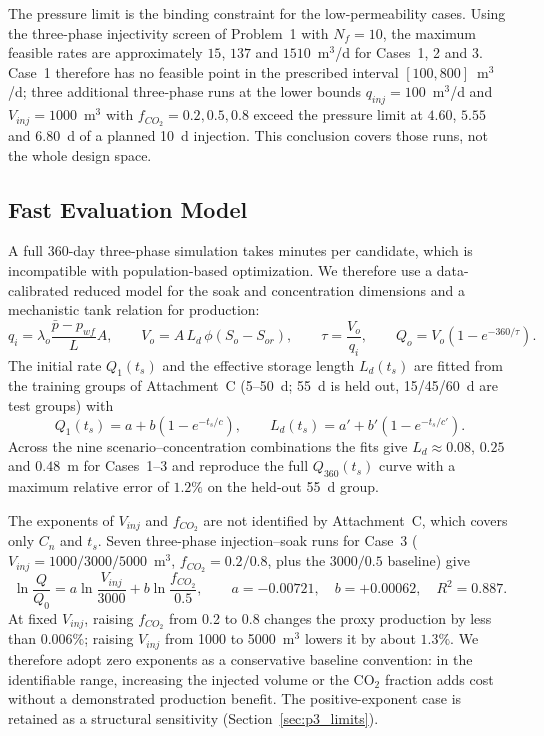 The pressure limit is the binding constraint for the low-permeability cases.
Using the three-phase injectivity screen of Problem~1 with $N_f=10$, the
maximum feasible rates are approximately $15$, $137$ and $1510$~m$^3$/d for
Cases~1, 2 and 3. Case~1 therefore has no feasible point in the prescribed
interval $[100,800]$~m$^3$/d; three additional three-phase runs at the lower
bounds $q_{inj}=100$~m$^3$/d and $V_{inj}=1000$~m$^3$ with
$f_{CO_2}=0.2,0.5,0.8$ exceed the pressure limit at $4.60$, $5.55$ and
$6.80$~d of a planned 10~d injection. This conclusion covers those runs, not
the whole design space.

\subsection{Fast Evaluation Model}

A full 360-day three-phase simulation takes minutes per candidate, which is
incompatible with population-based optimization. We therefore use a
data-calibrated reduced model for the soak and concentration dimensions and a
mechanistic tank relation for production:
\begin{equation}
q_i=\lambda_o\frac{\bar p-p_{wf}}{L}A,\qquad
V_o=A\,L_d\,\phi\left(S_o-S_{or}\right),\qquad
\tau=\frac{V_o}{q_i},\qquad
Q_o=V_o\left(1-e^{-360/\tau}\right).
\label{eq:tank}
\end{equation}
The initial rate $Q_1(t_s)$ and the effective storage length $L_d(t_s)$ are
fitted from the training groups of Attachment~C (5--50~d; 55~d is held out,
15/45/60~d are test groups) with
\begin{equation}
Q_1(t_s)=a+b\left(1-e^{-t_s/c}\right),\qquad
L_d(t_s)=a'+b'\left(1-e^{-t_s/c'}\right).
\label{eq:fit}
\end{equation}
Across the nine scenario--concentration combinations the fits give
$L_d\approx0.08$, $0.25$ and $0.48$~m for Cases~1--3 and reproduce the full
$Q_{360}(t_s)$ curve with a maximum relative error of $1.2\%$ on the held-out
55~d group.

The exponents of $V_{inj}$ and $f_{CO_2}$ are not identified by Attachment~C,
which covers only $C_n$ and $t_s$. Seven three-phase injection--soak runs for
Case~3 ($V_{inj}=1000/3000/5000$~m$^3$, $f_{CO_2}=0.2/0.8$, plus the
$3000/0.5$ baseline) give
\begin{equation}
\ln\frac{Q}{Q_0}=a\ln\frac{V_{inj}}{3000}+b\ln\frac{f_{CO_2}}{0.5},
\qquad a=-0.00721,\quad b=+0.00062,\quad R^2=0.887 .
\label{eq:vf}
\end{equation}
At fixed $V_{inj}$, raising $f_{CO_2}$ from 0.2 to 0.8 changes the proxy
production by less than $0.006\%$; raising $V_{inj}$ from 1000 to
5000~m$^3$ lowers it by about $1.3\%$. We therefore adopt zero exponents as a
conservative baseline convention: in the identifiable range, increasing the
injected volume or the CO$_2$ fraction adds cost without a demonstrated
production benefit. The positive-exponent case is retained as a structural
sensitivity (Section~\ref{sec:p3_limits}).

